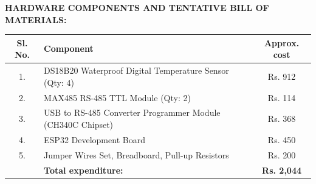 \documentclass[12pt,a4paper]{article}
\begin{document}
\vspace{12pt}

\noindent
\textbf{HARDWARE COMPONENTS AND TENTATIVE BILL OF MATERIALS:}

\vspace{8pt}

\begin{table}[H]
\centering
\begin{tabular}{|c|l|c|}
\hline
\textbf{Sl. No.} & \textbf{Component} & \textbf{Approx. cost} \\
\hline
1. & DS18B20 Waterproof Digital Temperature Sensor (Qty: 4) & Rs. 912 \\
\hline
2. & MAX485 RS-485 TTL Module (Qty: 2) & Rs. 114 \\
\hline
3. & USB to RS-485 Converter Programmer Module (CH340C Chipset) & Rs. 368 \\
\hline
4. & ESP32 Development Board & Rs. 450 \\
\hline
5. & Jumper Wires Set, Breadboard, Pull-up Resistors & Rs. 200 \\
\hline
& \textbf{Total expenditure:} & \textbf{Rs. 2,044} \\
\hline
\end{tabular}
\end{table}
\end{document}
